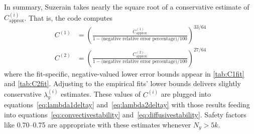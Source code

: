 \documentclass[letterpaper,11pt,nointlimits,reqno,draft]{amsbook}
\begin{document}
In summary, Suzerain takes nearly the square root of a conservative estimate of
$C_\text{approx}^{(i)}$.  That is, the code computes
\begin{align}
  C^{(1)} &= \left(
      \frac{C_\text{approx}^{(1)}}
           {1 - \text{(negative relative error percentage)}/100}
  \right)^{33/64}
\\
  C^{(2)} &= \left(
      \frac{C_\text{approx}^{(2)}}
           {1 - \text{(negative relative error percentage)}/100}
  \right)^{27/64}
\end{align}
where the fit-specific, negative-valued lower error bounds appear in
\autoref{tab:C1fit} and \autoref{tab:C2fit}.  Adjusting to the empirical fits'
lower bounds delivers slightly conservative $\lambda_y^{(i)}$ estimates.  These
values of $C^{(i)}$ are plugged into equations~\eqref{eq:lambda1deltay}
and~\eqref{eq:lambda2deltay} with those results feeding into
equations~\eqref{eq:convectivestability} and~\eqref{eq:diffusivestability}.
Safety factors like 0.70--0.75 are appropriate with these estimates whenever
$N_y > 5k$.
\end{document}
